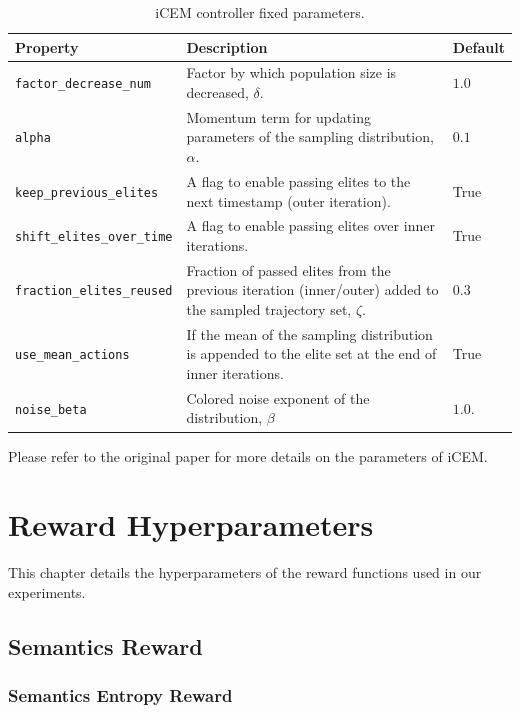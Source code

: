 \begin{table}[H]
    \centering
    \caption{iCEM controller fixed parameters.}
    \begin{tabularx}{\textwidth}{C{4.7cm} L C{2cm}}
        \hline
        Property & Description & Default\\
        \hline
        \texttt{factor\_decrease\_num} & Factor by which population size is decreased, \(\delta\). & \(1.0\)\\
        \texttt{alpha} & Momentum term for updating parameters of the sampling distribution, \(\alpha\). & \(0.1\)\\
        \texttt{keep\_previous\_elites} & A flag to enable passing elites to the next timestamp (outer iteration). & True\\
        \texttt{shift\_elites\_over\_time} & A flag to enable passing elites over inner iterations. & True\\
        \texttt{fraction\_elites\_reused} & Fraction of passed elites from the previous iteration (inner/outer) added to the sampled trajectory set, \(\zeta\). & \(0.3\)\\
        \texttt{use\_mean\_actions} & If the mean of the sampling distribution is appended to the elite set at the end of inner iterations. & True\\
        \texttt{noise\_beta} & Colored noise exponent of the distribution, \(\beta\) & \(1.0\).\\
        \hline
    \end{tabularx}
    \label{tab:icem-params-fixed}
\end{table}

Please refer to the original paper \citep{icem} for more details on the parameters of iCEM.

\chapter{Reward Hyperparameters}
\label{sec:reward-details}

This chapter details the hyperparameters of the reward functions used in our experiments.

\section{Semantics Reward}
\label{sec:semantics-reward-details}

\subsection{Semantics Entropy Reward}
\label{sec:semantics-entropy-reward-details}

